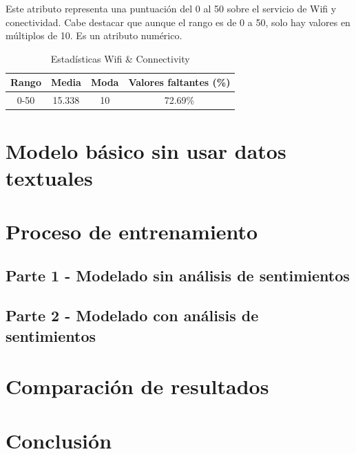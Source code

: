 \documentclass[12pt]{report} %
\begin{document}
    Este atributo representa una puntuación del 0 al 50 sobre el servicio de Wifi y conectividad.
    Cabe destacar que aunque el rango es de 0 a 50, solo hay valores en múltiplos de 10.
    Es un atributo numérico.

    \begin{table}[H]
        \begin{center}
            \begin{tabular}{ @{}cccc@{} }
                \toprule
                Rango & Media & Moda & Valores faltantes (\%) \\
                \midrule
                0-50 & 15.338 & 10 & 72.69\% \\
                \bottomrule
            \end{tabular}
            \caption{Estadísticas Wifi \& Connectivity}
        \end{center}
    \end{table}

\chapter{Modelo básico sin usar datos textuales}
\label{chap:basicModel}

\chapter{Proceso de entrenamiento}
\label{chap:train}

\section{Parte 1 - Modelado sin análisis de sentimientos}
\label{sec:parte1}

\section{Parte 2 - Modelado con análisis de sentimientos}
\label{sec:parte2}

\chapter{Comparación de resultados}
\label{chap:resultados}

\chapter{Conclusión}
\label{chap:conclusion}
\end{document}
